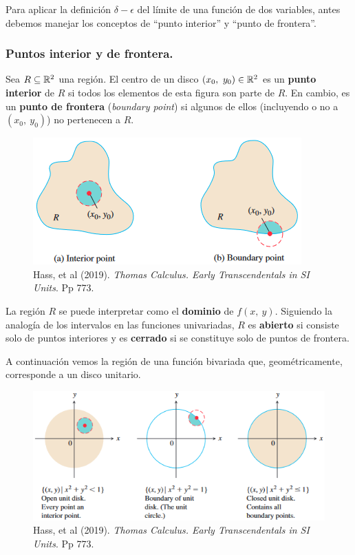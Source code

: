 \documentclass[12pt]{article}
\begin{document}
Para aplicar la definición $\delta-\epsilon$ del límite de una función de dos variables, antes debemos manejar los conceptos de ``punto interior'' y ``punto de frontera''.

\subsubsection{Puntos interior y de frontera.}

Sea $R \subseteq \mathbb{R}^{2}$ una región. El centro de un disco $(x_{0}, \ y_{0}) \in \mathbb{R}^{2}$ es un \textbf{punto interior} de $R$ si todos los elementos de esta figura son parte de $R$. En cambio, es un \textbf{punto de frontera} (\textit{boundary point}) si algunos de ellos (incluyendo o no a $(x_{0}, \ y_{0})$) no pertenecen a $R$.

\begin{figure}[hbt!]
\centering
\includegraphics[scale = 0.8]{puntos-interior-frontera-01.png}
\caption{Hass, et al (2019). \textit{Thomas Calculus. Early Transcendentals in SI Units}. Pp 773.}
\end{figure}

La región $R$ se puede interpretar como el \textbf{dominio} de $f(x, \ y)$. Siguiendo la analogía de los intervalos en las funciones univariadas, $R$ es \textbf{abierto} si consiste solo de puntos interiores y es \textbf{cerrado} si se constituye solo de puntos de frontera.

A continuación vemos la región de una función bivariada que, geométricamente, corresponde a un disco unitario.

\begin{figure}[hbt!]
\centering
\includegraphics[scale = 0.6]{puntos-interior-frontera-02.png}
\caption{Hass, et al (2019). \textit{Thomas Calculus. Early Transcendentals in SI Units}. Pp 773.}
\end{figure}
\end{document}
